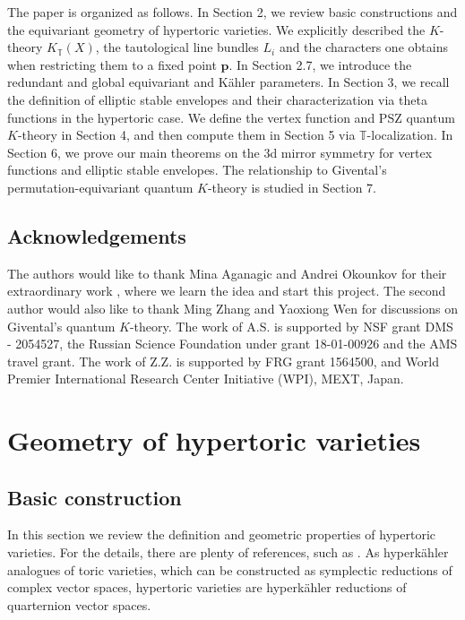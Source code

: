 \documentclass[10pt]{amsart}
\theoremstyle{definition}
\def\TT{\mathbb{T}}
\newcommand{\bp}{\mathbf{p}}
\theoremstyle{definition}
\numberwithin{equation}{section}
\theoremstyle{Theorem}
\begin{document}
The paper is organized as follows. In Section 2, we review basic constructions and the equivariant geometry of hypertoric varieties. We explicitly described the $K$-theory $K_\TT (X)$, the tautological line bundles $L_i$ and the characters one obtains when restricting them to a fixed point $\bp$. In Section 2.7, we introduce the redundant and global equivariant and K\"ahler parameters. In Section 3, we recall the definition of elliptic stable envelopes and their characterization via theta functions in the hypertoric case. We define the vertex function and PSZ quantum $K$-theory in Section 4, and then compute them in Section 5 via $\TT$-localization. In Section 6, we prove our main theorems on the 3d mirror symmetry for vertex functions and elliptic stable envelopes. The relationship to Givental's permutation-equivariant quantum $K$-theory is studied in Section 7.


\subsection{Acknowledgements}

The authors would like to thank Mina Aganagic and Andrei Okounkov for their extraordinary work \cite{AOelliptic}, where we learn the idea and start this project. The second author would also like to thank Ming Zhang and Yaoxiong Wen for discussions on Givental's quantum $K$-theory. The work of A.S. is supported by NSF grant DMS - 2054527, the Russian Science Foundation under grant 18-01-00926 and the AMS travel grant. The work of Z.Z. is supported by FRG grant 1564500, and World Premier International Research Center Initiative (WPI), MEXT, Japan.


\vspace{3ex}












\section{Geometry of hypertoric varieties}

\subsection{Basic construction} \label{Sec-basic}

In this section we review the definition and geometric properties of hypertoric varieties. For the details, there are plenty of references, such as \cite{BD, HH, HP, HS, Kon, Kon2}. As hyperk\"ahler analogues of toric varieties, which can be constructed as symplectic reductions of complex vector spaces, hypertoric varieties are hyperk\"ahler reductions of quarternion vector spaces.
\end{document}
